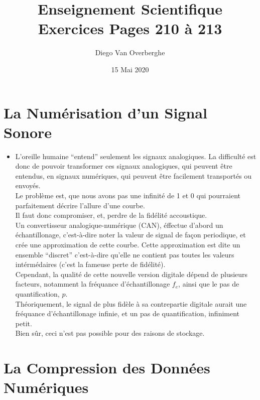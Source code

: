 \documentclass[12pt, a4paper]{article}
\begin{document}
    \title{Enseignement Scientifique \\ Exercices Pages 210 à 213}
    \author{Diego Van Overberghe}
    \date{15 Mai 2020}
    \maketitle

    \section{La Numérisation d'un Signal Sonore}
    \begin{itemize}
        \item[] L'oreille humaine ``entend'' seulement les signaux analogiques. La difficulté est donc de pouvoir transformer ces signaux analogiques, qui peuvent être entendus, en signaux numériques, qui peuvent être facilement transportés ou envoyés. \\ Le problème est, que nous avons pas une infinité de 1 et 0 qui pourraient parfaitement décrire l'allure d'une courbe. \\ Il faut donc compromiser, et, perdre de la fidélité accoustique. \\ Un convertisseur analogique-numérique (CAN), éffectue d'abord un échantillonage, c'est-à-dire noter la valeur de signal de façon periodique, et crée une approximation de cette courbe. Cette approximation est dite un ensemble ``discret'' c'est-à-dire qu'elle ne contient pas toutes les valeurs intérmédaires (c'est la fameuse perte de fidélité). \\ Cependant, la qualité de cette nouvelle version digitale dépend de plusieurs facteurs, notamment la fréquance d'échantillonage $f_e$, ainsi que le pas de quantification, $p$. \\ Théoriquement, le signal de plus fidèle à sa contrepartie digitale aurait une fréquance d'échantillonage infinie, et un pas de quantification, infiniment petit. \\ Bien sûr, ceci n'est pas possible pour des raisons de stockage.
    \end{itemize}
    
    \section{La Compression des Données Numériques}
\end{document}
